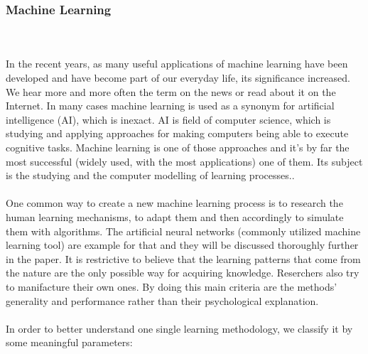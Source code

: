 \documentclass[runningheads,a4paper]{llncs}[2015/06/24]
\begin{document}
		\subsubsection{Machine Learning}\hspace{1cm}\\\\ 
In the recent years, as many useful applications of machine learning have been developed and have become part of our everyday life, its significance increased. We hear more and more often the term on the news or read about it on the Internet. In many cases machine learning is used as a synonym for artificial intelligence (AI), which is inexact. AI is field of computer science, which is studying and  applying approaches for making computers being able to execute cognitive tasks\cite{AIvsML}. Machine learning is one of those approaches and it's by far the most successful (widely used, with the most applications) one of them\cite{quinlan1986induction}. Its subject is the studying and the computer modelling of learning processes.\cite{Michalski1983}. \\\\ One common way to create a new machine learning process is to research the human learning mechanisms, to adapt them and then accordingly to simulate them  with algorithms. The artificial neural networks (commonly utilized machine learning tool) are example for that and they will be discussed thoroughly further in the paper. It is  restrictive to believe that the learning patterns that come from the nature are the only possible way for acquiring knowledge. Reserchers also try to manifacture their own ones. By doing this main criteria are the methods'  generality and performance rather than their psychological explanation\cite{Michalski1983}.\\\\ 
In order to better understand one single learning methodology, we classify it by some meaningful parameters:
\end{document}
